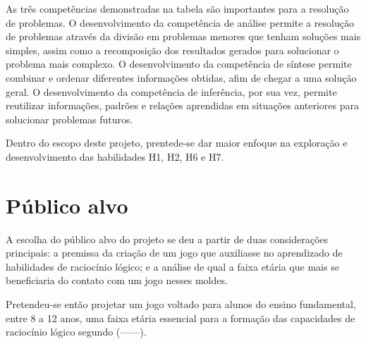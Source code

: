 As três competências demonstradas na tabela são importantes para a resolução de problemas. O desenvolvimento da competência de análise permite a resolução de problemas através da divisão em problemas menores que tenham soluções mais simples, assim como a recomposição dos resultados gerados para solucionar o problema mais complexo. O desenvolvimento da competência de síntese permite combinar e ordenar diferentes informações obtidas, afim de chegar a uma solução geral. O desenvolvimento da competência de inferência, por sua vez, permite reutilizar informações, padrões e relações aprendidas em situações anteriores para solucionar problemas futuros.

Dentro do escopo deste projeto, prentede-se dar maior enfoque na exploração e desenvolvimento das habilidades H1, H2, H6 e H7.

\section{Público alvo}\label{sec-publico-alvo}

A escolha do público alvo do projeto se deu a partir de duas considerações principais: a premissa da criação de um jogo que auxiliasse no aprendizado de habilidades de raciocínio lógico; e a análise de qual a faixa etária que mais se beneficiaria do contato com um jogo nesses moldes.

Pretendeu-se então projetar um jogo voltado para alunos do ensino fundamental, entre 8 a 12 anos, uma faixa etária essencial para a formação das capacidades de raciocínio lógico segundo (------).
